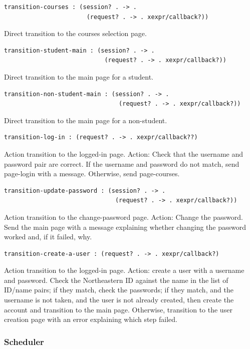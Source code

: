 \documentclass[a4paper]{article}
\begin{document}
\begin{verbatim}
transition-courses : (session? . -> .
                       (request? . -> . xexpr/callback?))
\end{verbatim}
Direct transition to the courses selection page.

\begin{verbatim}
transition-student-main : (session? . -> .
                            (request? . -> . xexpr/callback?))
\end{verbatim}
Direct transition to the main page for a student.

\begin{verbatim}
transition-non-student-main : (session? . -> .
                                (request? . -> . xexpr/callback?))
\end{verbatim}
Direct transition to the main page for a non-student.

\begin{verbatim}
transition-log-in : (request? . -> . xexpr/callback??)
\end{verbatim}
Action transition to the logged-in page.
Action: Check that the username and password pair are correct.
If the username and password do not match, send page-login with a message.
Otherwise, send page-courses.

\begin{verbatim}
transition-update-password : (session? . -> .
                               (request? . -> . xexpr/callback?))
\end{verbatim}
Action transition to the change-password page.
Action: Change the password.
Send the main page with a message explaining whether changing the password
worked and, if it failed, why.

\begin{verbatim}
transition-create-a-user : (request? . -> . xexpr/callback?)
\end{verbatim}
Action transition to the logged-in page.
Action: create a user with a username and password.
Check the Northeastern ID against the name in the list of
ID/name pairs; if they match, check the passwords; if they
match, and the username is not taken, and the user is not
already created, then create the account and transition to
the main page. Otherwise, transition to the user
creation page with an error explaining which step failed.

\subsubsection{Scheduler}\label{subsubsec:scheduler}
\end{document}
